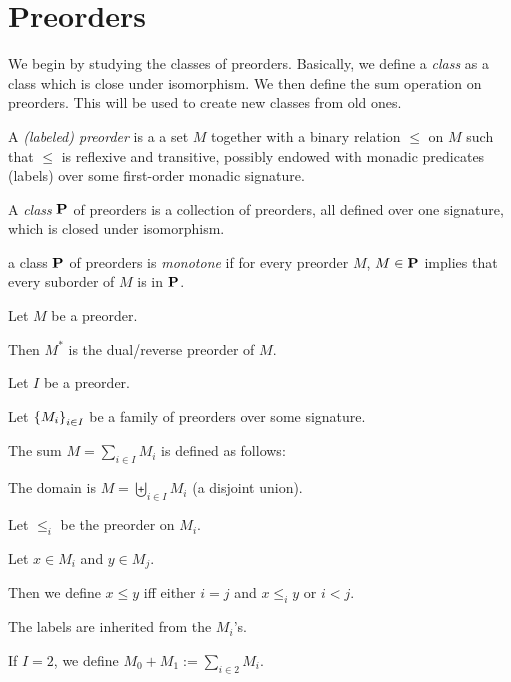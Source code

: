 \section{Preorders}
We begin by studying the classes of preorders. Basically, we define a \emph{class} as a class which is close under
isomorphism. We then define the sum operation on preorders. This will be used to create new classes from old ones.

\begin{definitions} [Preorder]
  A \emph{(labeled) preorder} is a a set $M$
  together with a binary relation $\le$ on $M$ such that
  $\le$ is reflexive and transitive,
  possibly endowed with monadic predicates (labels)
  over some first-order monadic signature.
\end{definitions}

\begin{definition}
  A \emph{class} $\mathbf{P}$ of preorders is a collection of preorders,
  all defined over one signature,
  which is closed under isomorphism.
\end{definition}

\begin{definition}
  a class $\mathbf{P}$ of preorders is \emph{monotone} if for every preorder $M$,
  $M \in \mathbf{P}$ implies that every suborder of $M$ is in $\mathbf{P}$.
\end{definition}

\begin{definition}
  Let $M$ be a preorder.

  Then $M^\ast$ is the dual/reverse preorder of $M$.
\end{definition}

\begin{definition}
  Let $I$ be a preorder.

  Let $\left\{ {M_i} \right\}_{i \in I}$ be a family of preorders
  over some signature.

  The sum $M = \sum_{i \in I} M_i$ is defined as follows:

  The domain is $M = \biguplus_{i \in I} M_i$ (a disjoint union).

  Let $\le_i$ be the preorder on $M_i$.

  Let $x \in M_i$ and $y \in M_j$.

  Then we define $x \le y$ iff either
  $i = j$ and $x \le_i y$ or $i < j$.

  The labels are inherited from the $M_i$'s.

  If $I = 2$, we define $M_0 + M_1 := \sum_{i \in 2} M_i$.
\end{definition}

